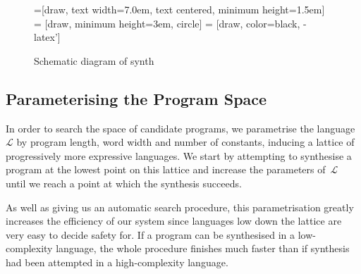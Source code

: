 \begin{figure}
\begin{center}
=[draw, text width=7.0em, text centered,
  minimum height=1.5em]
 = [draw, minimum height=3em, circle]
 = [draw, color=black, -latex']


\end{center}

\caption{Schematic diagram of {\sc synth}}
\label{fig:synth-dfd}
\end{figure}


\subsection{Parameterising the Program Space}


In order to search the space of candidate programs, we parametrise
the language~$\mathcal{L}$ by program length, word width and number of constants,
inducing a lattice of progressively
more expressive languages.  We start by attempting to synthesise
a program at the lowest point on this lattice and increase the
parameters of~$\mathcal{L}$ until we reach a point at which
the synthesis succeeds.

As well as giving us an automatic search procedure, this parametrisation
greatly increases the efficiency of our system since languages
low down the lattice are very easy to decide safety for.  If a program
can be synthesised in a low-complexity language, the whole procedure
finishes much faster than if synthesis had been attempted in a
high-complexity language.


